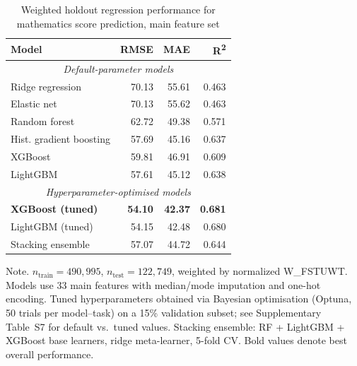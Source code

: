 \begin{table}[htp]
\centering
\caption{Weighted holdout regression performance for mathematics score prediction, main feature set\label{tab:regression}}
\begin{tabular}{@{}lrrr@{}}
\toprule
\textbf{Model} & \textbf{RMSE} & \textbf{MAE} & \textbf{R\textsuperscript{2}} \\
\midrule
\multicolumn{4}{c}{\textit{Default-parameter models}} \\
\midrule
  Ridge regression & 70.13 & 55.61 & 0.463 \\
  Elastic net & 70.13 & 55.62 & 0.463 \\
  Random forest & 62.72 & 49.38 & 0.571 \\
  Hist. gradient boosting & 57.69 & 45.16 & 0.637 \\
  XGBoost & 59.81 & 46.91 & 0.609 \\
  LightGBM & 57.61 & 45.12 & 0.638 \\
\midrule
\multicolumn{4}{c}{\textit{Hyperparameter-optimised models}} \\
\midrule
  \textbf{XGBoost (tuned)} & \textbf{54.10} & \textbf{42.37} & \textbf{0.681} \\
  LightGBM (tuned) & 54.15 & 42.48 & 0.680 \\
  Stacking ensemble & 57.07 & 44.72 & 0.644 \\
\bottomrule
\end{tabular}
\begin{tablenotes}
\item Note. $n_\text{train} = 490{,}995$, $n_\text{test} = 122{,}749$, weighted by normalized W\_FSTUWT. Models use 33 main features with median/mode imputation and one-hot encoding. Tuned hyperparameters obtained via Bayesian optimisation (Optuna, 50 trials per model--task) on a 15\% validation subset; see Supplementary Table~S7 for default vs.\ tuned values. Stacking ensemble: RF + LightGBM + XGBoost base learners, ridge meta-learner, 5-fold CV. Bold values denote best overall performance.
\end{tablenotes}
\end{table}
